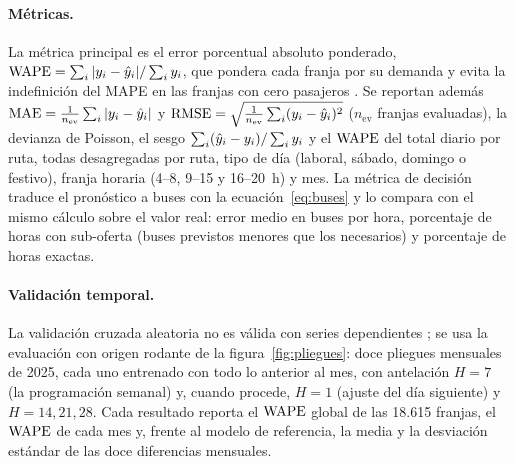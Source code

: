 \paragraph{Métricas.}
La métrica principal es el error porcentual absoluto ponderado,
$\mathrm{WAPE} = \sum_i |y_i - \hat{y}_i| / \sum_i y_i$, que pondera cada franja por su demanda y evita la
indefinición del MAPE en las franjas con cero pasajeros \citep{hyndman2006measures}. Se reportan además
$\mathrm{MAE} = \frac{1}{n_{\mathrm{ev}}}\sum_i |y_i - \hat{y}_i|$ y
$\mathrm{RMSE} = \sqrt{\frac{1}{n_{\mathrm{ev}}}\sum_i (y_i - \hat{y}_i)^2}$ ($n_{\mathrm{ev}}$ franjas evaluadas), la
devianza de Poisson, el sesgo $\sum_i (\hat{y}_i - y_i)/\sum_i y_i$ y el $\mathrm{WAPE}$ del total diario por ruta, todas
desagregadas por ruta, tipo de día (laboral, sábado, domingo o festivo), franja horaria (4--8, 9--15 y
16--20~h) y mes. La métrica de decisión traduce el pronóstico a buses con la ecuación~\eqref{eq:buses} y lo
compara con el mismo cálculo sobre el valor real: error medio en buses por hora, porcentaje de horas con
sub-oferta (buses previstos menores que los necesarios) y porcentaje de horas exactas.

\paragraph{Validación temporal.}
La validación cruzada aleatoria no es válida con series dependientes \citep{bergmeir2012}; se usa la
evaluación con origen rodante de la figura~\ref{fig:pliegues}: doce pliegues mensuales de 2025, cada uno
entrenado con todo lo anterior al mes, con antelación $H = 7$ (la programación semanal) y, cuando procede,
$H = 1$ (ajuste del día siguiente) y $H = 14, 21, 28$. Cada resultado reporta el $\mathrm{WAPE}$ global de las 18.615
franjas, el $\mathrm{WAPE}$ de cada mes y, frente al modelo de referencia, la media y la desviación estándar de las
doce diferencias mensuales.

